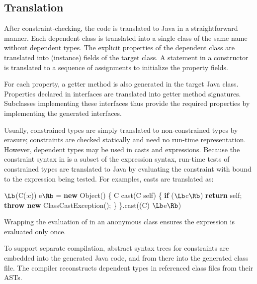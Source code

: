 


\subsection{Translation}

After constraint-checking, the \Xten{} code is translated to
Java in a straightforward manner.  Each dependent class
is translated into a single class of the same name without dependent
types. The explicit properties of the dependent class are translated
into  (instance) fields of the target class.
A  statement in a constructor is translated to a
sequence of assignments to initialize the property fields.

For each property, a getter method is also generated in the
target Java class.
Properties declared in interfaces are translated into getter
method signatures.  Subclasses implementing these interfaces
thus provide the required properties by implementing the
generated interfaces.

Usually, constrained types are simply translated to
non-constrained types by erasure; constraints are checked
statically and need no run-time representation.
However, dependent types may be used in casts
and  expressions.  Because the constraint syntax
in \Xten{} is a subset of the \Xten{} expression syntax, run-time tests
of constrained types are translated to Java
by evaluating the constraint with
 bound to the expression being tested.
For examples, casts are translated as:
\begin{code}
  $\Lb$(C(:c)) e$\Rb$ = 
    \textbf{new} Object() \{
      C cast(C self) \{
        \textbf{if} ($\Lb$c$\Rb$) \textbf{return} self;
        \textbf{throw new} ClassCastException(); \}
    \}.cast((C) $\Lb$e$\Rb$)
\end{code}
\noindent Wrapping the evaluation of  in an anonymous class
ensures the expression  is evaluated only once.

To support separate compilation, abstract syntax trees for
constraints are embedded into the generated Java code, and from
there into the generated class file.  The compiler reconstructs
dependent types in referenced class files from their ASTs.

